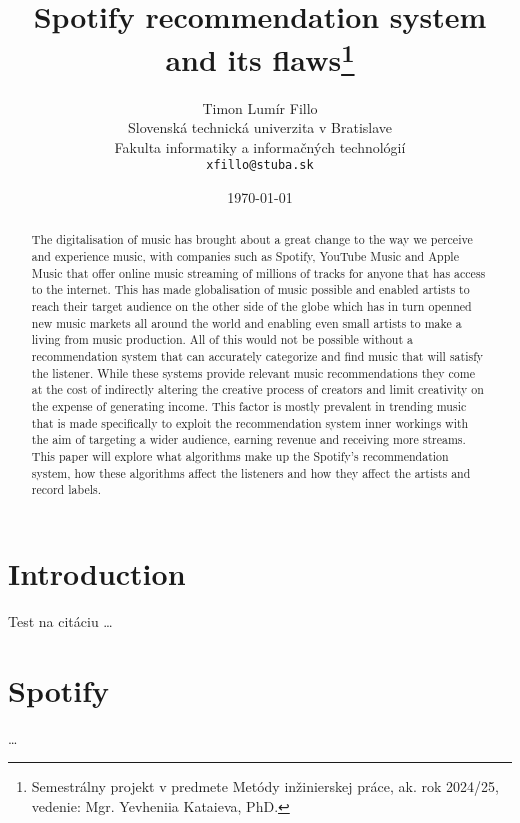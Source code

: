 \documentclass[10pt,twoside,slovak,a4paper]{article}
\title{Spotify recommendation system and its flaws\thanks{Semestrálny projekt v predmete Metódy inžinierskej práce, ak. rok 2024/25, vedenie: Mgr. Yevheniia Kataieva, PhD.}} %
\author{Timon Lumír Fillo\\[2pt]
	{\small Slovenská technická univerzita v Bratislave}\\
	{\small Fakulta informatiky a informačných technológií}\\
	{\small \texttt{xfillo@stuba.sk}}
	}
\date{\small \today} %
\begin{document}
\maketitle

\begin{abstract}

The digitalisation of music has brought about a great change to the way we perceive and experience music, with companies such as Spotify, YouTube Music and Apple Music that offer online music streaming of millions of tracks for anyone that has access to the internet. This has made globalisation of music possible and enabled artists to reach their target audience on the other side of the globe which has in turn openned new music markets all around the world and enabling even small artists to make a living from music production. All of this would not be possible without a recommendation system that can accurately categorize and find music that will satisfy the listener. While these systems provide relevant music recommendations they come at the cost of indirectly altering the creative process of creators and limit creativity on the expense of generating income. This factor is mostly prevalent in trending music that is made specifically to exploit the recommendation system inner workings with the aim of targeting a wider audience, earning revenue and receiving more streams. This paper will explore what algorithms make up the Spotify's recommendation system, how these algorithms affect the listeners and how they affect the artists and record labels.

\end{abstract}



\section{Introduction}
Test na citáciu
\cite{hodgson2021spotify}
\dots


\section{Spotify}\label{spotify}
\dots
\end{document}
